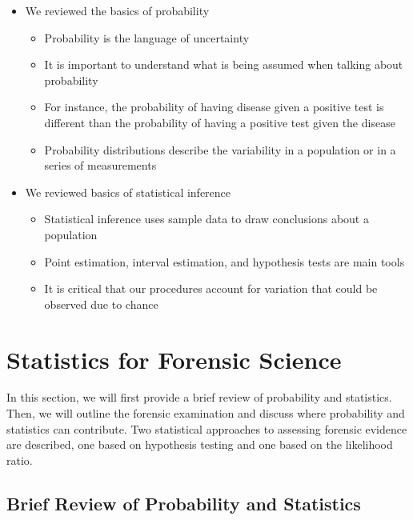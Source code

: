 \documentclass[]{book}
\providecommand{\tightlist}{%
  \setlength{\itemsep}{0pt}\setlength{\parskip}{0pt}}
\theoremstyle{definition}
\theoremstyle{definition}
\theoremstyle{remark}
\begin{document}
\begin{itemize}
\tightlist
\item
  We reviewed the basics of probability

  \begin{itemize}
  \tightlist
  \item
    Probability is the language of uncertainty
  \item
    It is important to understand what is being assumed when talking
    about probability
  \item
    For instance, the probability of having disease given a positive
    test is different than the probability of having a positive test
    given the disease
  \item
    Probability distributions describe the variability in a population
    or in a series of measurements
  \end{itemize}
\item
  We reviewed basics of statistical inference

  \begin{itemize}
  \tightlist
  \item
    Statistical inference uses sample data to draw conclusions about a
    population
  \item
    Point estimation, interval estimation, and hypothesis tests are main
    tools
  \item
    It is critical that our procedures account for variation that could
    be observed due to chance
  \end{itemize}
\end{itemize}

\chapter{Statistics for Forensic
Science}\label{statistics-for-forensic-science}

In this section, we will first provide a brief review of probability and
statistics. Then, we will outline the forensic examination and discuss
where probability and statistics can contribute. Two statistical
approaches to assessing forensic evidence are described, one based on
hypothesis testing and one based on the likelihood ratio.

\section{Brief Review of Probability and
Statistics}\label{brief-review-of-probability-and-statistics}
\end{document}
